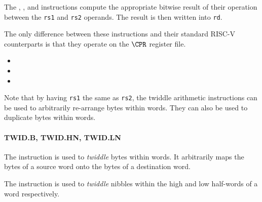The , , and  instructions compute the
appropriate bitwise result of their operation between the {\tt rs1} and
{\tt rs2} operands. The result is then written into {\tt rd}.

The only difference between these instructions and their standard RISC-V
counterparts is that they operate on the $\CPR$ register file.

\begin{itemize}
\item {}
\item {}
\item {}
\end{itemize}

Note that by having {\tt rs1} the same as {\tt rs2}, the twiddle
arithmetic instructions can be used to arbitrarily re-arrange bytes
within words. They can also be used to duplicate bytes within words.

\paragraph{TWID.B, TWID.HN, TWID.LN}

The  instruction is used to {\em twiddle} bytes within words.
It arbitrarily maps the bytes of a source word onto the bytes of a
destination word.

The  instruction is used to {\em twiddle} nibbles within
the high and low half-words of a word respectively.

